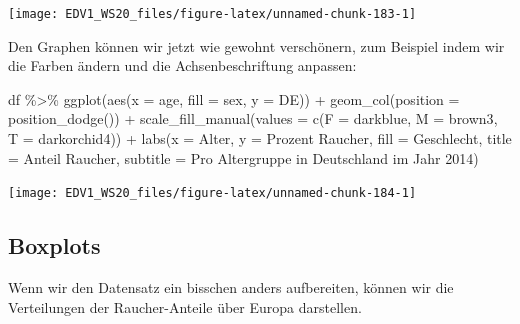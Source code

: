 \documentclass[
]{book}
\newenvironment{Shaded}{\begin{snugshade}}{\end{snugshade}}
\newcommand{\AttributeTok}[1]{\textcolor[rgb]{0.77,0.63,0.00}{#1}}
\newcommand{\FunctionTok}[1]{\textcolor[rgb]{0.00,0.00,0.00}{#1}}
\newcommand{\NormalTok}[1]{#1}
\newcommand{\SpecialCharTok}[1]{\textcolor[rgb]{0.00,0.00,0.00}{#1}}
\newcommand{\StringTok}[1]{\textcolor[rgb]{0.31,0.60,0.02}{#1}}
\begin{document}
\begin{center}\texttt{[image: EDV1\_WS20\_files/figure-latex/unnamed-chunk-183-1]} \end{center}

Den Graphen können wir jetzt wie gewohnt verschönern, zum Beispiel indem wir die Farben ändern und die Achsenbeschriftung anpassen:

\begin{Shaded}
\begin{Highlighting}[]
\NormalTok{df }\SpecialCharTok{\%\textgreater{}\%} 
  \FunctionTok{ggplot}\NormalTok{(}\FunctionTok{aes}\NormalTok{(}\AttributeTok{x =}\NormalTok{ age, }\AttributeTok{fill =}\NormalTok{ sex, }\AttributeTok{y =}\NormalTok{ DE)) }\SpecialCharTok{+}
  \FunctionTok{geom\_col}\NormalTok{(}\AttributeTok{position =} \FunctionTok{position\_dodge}\NormalTok{()) }\SpecialCharTok{+}
  \FunctionTok{scale\_fill\_manual}\NormalTok{(}\AttributeTok{values =} \FunctionTok{c}\NormalTok{(}\AttributeTok{F =} \StringTok{\textquotesingle{}darkblue\textquotesingle{}}\NormalTok{,}
                               \AttributeTok{M =} \StringTok{\textquotesingle{}brown3\textquotesingle{}}\NormalTok{,}
                               \AttributeTok{T =} \StringTok{\textquotesingle{}darkorchid4\textquotesingle{}}\NormalTok{)) }\SpecialCharTok{+}
  \FunctionTok{labs}\NormalTok{(}\AttributeTok{x =} \StringTok{\textquotesingle{}Alter\textquotesingle{}}\NormalTok{,}
       \AttributeTok{y =} \StringTok{\textquotesingle{}Prozent Raucher\textquotesingle{}}\NormalTok{,}
       \AttributeTok{fill =} \StringTok{\textquotesingle{}Geschlecht\textquotesingle{}}\NormalTok{,}
       \AttributeTok{title =} \StringTok{\textquotesingle{}Anteil Raucher\textquotesingle{}}\NormalTok{,}
       \AttributeTok{subtitle =} \StringTok{\textquotesingle{}Pro Altergruppe in Deutschland im Jahr 2014\textquotesingle{}}\NormalTok{)}
\end{Highlighting}
\end{Shaded}

\begin{center}\texttt{[image: EDV1\_WS20\_files/figure-latex/unnamed-chunk-184-1]} \end{center}

\hypertarget{boxplots-1}{%
\subsection{Boxplots}\label{boxplots-1}}

Wenn wir den Datensatz ein bisschen anders aufbereiten, können wir die Verteilungen der Raucher-Anteile über Europa darstellen.
\end{document}
